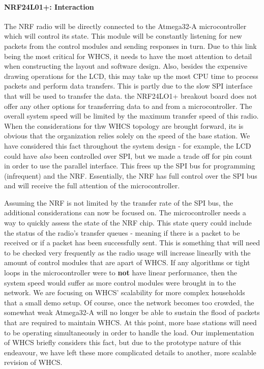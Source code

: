 \paragraph{NRF24L01+: Interaction}
The NRF radio will be directly connected to the Atmega32-A microcontroller
which will control its state. This module will be constantly listening for new
packets from the control modules and sending responses in turn. Due to this
link being the most critical for WHCS, it needs to have the most attention to
detail when constructing the layout and software design. Also, besides the
expensive drawing operations for the LCD, this may take up the most CPU time to
process packets and perform data transfers. This is partly due to the slow SPI
interface that will be used to transfer the data. the NRF24LO1+ breakout board
does not offer any other options for transferring data to and from a
microcontroller. The overall system speed will be limited by the maximum
transfer speed of this radio. When the considerations for thw WHCS topology are
brought forward, its is obvious that the organization relies solely on the
speed of the base station. We have considered this fact throughout the system
design - for example, the LCD could have \emph{also} been controlled over SPI,
but we made a trade off for pin count in order to use the parallel interface.
This frees up the SPI bus for programming (infrequent) and the NRF.
Essentially, the NRF has full control over the SPI bus and will receive the
full attention of the microcontroller. 

Assuming the NRF is not limited by the transfer rate of the SPI bus, the
additional considerations can now be focused on. The microcontroller needs a
way to quickly assess the state of the NRF chip. This state query could include
the status of the radio's transfer queues - meaning if there is a packet to be
received or if a packet has been successfully sent. This is something that will
need to be checked very frequently as the radio usage will increase linearlly
with the amount of control modules that are apart of WHCS. If any algorithms or
tight loops in the microcontroller were to \textbf{not} have linear
performance, then the system speed would suffer as more control modules were
brought in to the network. We are focusing on WHCS' scalability for more
complex households that a small demo setup. Of course, once the network becomes
too crowded, the somewhat weak Atmega32-A will no longer be able to sustain the
flood of packets that are required to maintain WHCS. At this point, more base
stations will need to be operating simultaneously in order to handle the load.
Our implementation of WHCS briefly considers this fact, but due to the
prototype nature of this endeavour, we have left these more complicated details
to another, more scalable revision of WHCS.

